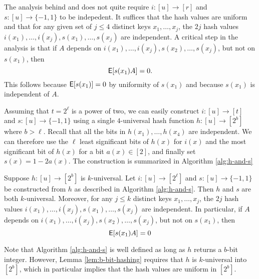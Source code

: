 The analysis behind  and  does not quite
require $i:[u]\to[r]$ and $s:[u]\to\{-1,1\}$ to be indepedent.
It suffices that the hash values are uniform and that for any
given set of $j\leq 4$ distinct keys $x_1,\ldots,x_j$, the $2j$ hash
values $i(x_1),\ldots,i(x_j),s(x_1),\ldots,s(x_j)$ are independent.
A critical step in the analysis is that if
$A$ depends on $i(x_1),\ldots,i(x_j),s(x_2),\ldots,s(x_j)$, but
not on $s(x_1)$, then
\[\operatorname*{\sf{E}}[s(x_1)A]=0.\]
This follows because $\operatorname*{\sf{E}}[s(x_1)]=0$ by uniformity of $s(x_1)$ and because $s(x_1)$ is independent of $A$.


Assuming that $t=2^\ell$ is a power of two, we can easily construct
$i:[u]\to[t]$ and $s:[u]\to\{-1,1\}$ using a single $4$-universal
hash function $h:[u]\to[2^b]$ where $b>\ell$. Recall that all the bits in
$h(x_1),\ldots,h(x_4)$ are independent. We can therefore use the
$\ell$ least significant bits of $h(x)$ for $i(x)$ and the most
significant bit of $h(x)$ for a bit $a(x)\in[2]$, and finally set
$s(x)=1-2a(x)$. The construction is summarized in Algorithm \ref{alg:h-and-s}
\begin{lemma}\label{lem:b-bit-hashing} Suppose $h:[u]\to[2^b]$ is $k$-universal. Let
   $i:[u]\to[2^\ell]$ and
   $s:[u]\to\{-1,1\}$ be constructed from $h$ as described in Algorithm \ref{alg:h-and-s}. Then $h$ and $s$ are both $k$-universal. Moreover, for
   any $j\leq k$ distinct keys $x_1,\ldots,x_j$, the $2j$ hash
   values $i(x_1),\ldots,i(x_j),s(x_1),\ldots,s(x_j)$ are independent.
   In particular, if $A$ depends on
   $i(x_1),\ldots,i(x_j),s(x_2),\ldots,s(x_j)$, but not on $s(x_1)$, then
   \begin{equation}\label{eq:E-0}
      \operatorname*{\sf{E}}[s(x_1)A]=0
   \end{equation}
\end{lemma}
Note that Algorithm \ref{alg:h-and-s} is well defined as long as 
$h$ returns a $b$-bit integer. However, Lemma \ref{lem:b-bit-hashing} requires
that $h$ is $k$-universal into $[2^b]$, which in particular implies that
the hash values are uniform in $[2^b]$.


